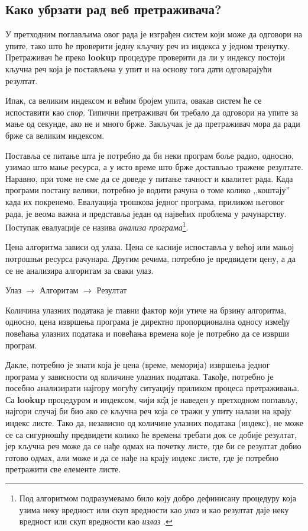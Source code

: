 \subsection{Како убрзати рад веб претраживача?}

У претходним поглављима овог рада је изграђен систем који може да одговори на упите, тако што ће проверити једну кључну реч из индекса у једном тренутку. Претраживач ће преко \textbf{lookup} процедуре проверити да ли у индексу постоји кључна реч која је постављена у упит и на основу тога дати одговарајући резултат.

Ипак, са великим индексом и већим бројем упита, овакав систем ће се испоставити као \emph{спор}. Типични претраживач би требало да одговори на упите за мање од секунде, ако не и много брже. Закључак је да претраживач мора да ради брже са великим индексом.

Поставља се питање шта је потребно да би неки програм боље радио, односно,
узимао што мање ресурса, а у исто време што брже достављао тражене резултате.
Наравно, при томе не сме да се доведе у питање тачност и квалитет рада. Када
програми постану велики, потребно је водити рачуна о томе колико ,,коштају''
када их покренемо. Евалуација трошкова једног програма, приликом његовог рада, је
веома важна и представља један од највећих проблема у рачунарству. Поступак
евалуације се назива \emph{анализа програма}\footnote{Под алгоритмом подразумевамо било коју
добро дефинисану процедуру која узима неку вредност или скуп вредности као
\emph{улаз} и као резултат даје неку вредност или скуп вредности као
\emph{излаз} \cite{cormen2001introduction}.}.

Цена алгоритма зависи од улаза. Цена се касније испоставља у већој или
мањој потрошњи ресурса рачунара.
Другим речима, потребно је предвидети цену, а да се не анализира алгоритам за сваки улаз.

Улаз $\longrightarrow$ Алгоритам $\longrightarrow$ Резултат


Количина улазних података је главни фактор који утиче на брзину алгоритма,
односно, цена извршења програма је директно пропорционална односу између повећања улазних података и повећања времена које је потребно да се изврши програм.

Дакле, потребно је знати која је цена (време, меморија) извршења једног програма
у зависности од количине улазних података. Такође, потребно је посебно
анализирати најгору могућу ситуацију приликом процеса претраживања. Са
\textbf{lookup} процедуром и индексом, чији к\^{о}д је наведен у претходном поглављу, најгори случај би био ако се кључна реч која се тражи у упиту налази на крају индекс листе. Тако да, независно од количине улазних података (индекс), не може се са сигурношћу предвидети колико ће времена требати док се добије резултат, јер кључна реч може да се нађе одмах на почетку листе, где би се резултат добио готово одмах, али може и да се нађе на крају индекс листе, где је потребно претражити све елементе листе.

